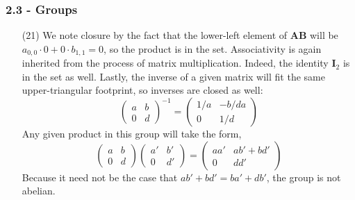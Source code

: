 \documentclass{beamer}
\begin{document}
\begin{frame}
\frametitle{2.3 - Groups}
\small
\begin{enumerate}
	\item[(21)] We note closure by the fact that the lower-left element of $\mathbf{AB}$ will be $a_{0,0}\cdot 0 + 0\cdot b_{1,1} = 0$, so the product is in the set. Associativity is again inherited from the process of matrix multiplication. Indeed, the identity $\mathbf I_2$ is in the set as well. Lastly, the inverse of a given matrix will fit the same upper-triangular footprint, so inverses are closed as well:
	\begin{equation*}
		\begin{pmatrix}
			a & b \\
			0 & d
		\end{pmatrix}^{-1} = 
		\begin{pmatrix}
			1/a & -b/da \\
			0 & 1/d
		\end{pmatrix}
	\end{equation*}
	Any given product in this group will take the form,
	\begin{equation*}
		\begin{pmatrix}
			a & b \\
			0 & d
		\end{pmatrix}
		\begin{pmatrix}
			a' & b' \\
			0 & d'
		\end{pmatrix} = 
		\begin{pmatrix}
			aa' & ab' + bd' \\
			0 & dd'
		\end{pmatrix}
	\end{equation*}
	Because it need not be the case that $ab' + bd' = ba' + db'$, the group is not abelian.
\end{enumerate}
\end{frame}
\end{document}
